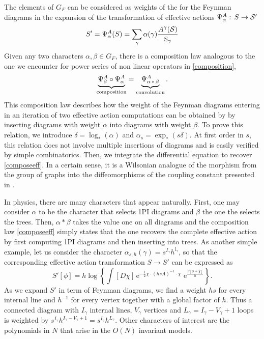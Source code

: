 \documentclass[12pt,here,feynmf]{article}
\begin{document}
The elements of $G_{F}$ can be considered as weights of the for the Feynman diagrams in the expansion of the transformation of effective actions $\Psi^{A}_{\alpha}:\,S\rightarrow{\cal
S}'$
\begin{equation}
S'=\Psi^{A}_{\alpha}(S)=\sum_{\gamma}\alpha(\gamma)\frac{A^{\gamma}({\cal
S})}{{\mbox{{\small S}}_{\gamma}}}
\end{equation}
Given any two characters $\alpha,\beta\in G_{F}$, there is a composition law analogous to the one we encounter for power series of non linear operators in \eqref{composition},
\begin{equation}
\underbrace{\Psi^{A}_{\beta}\circ\Psi^{A}_{\alpha}}_{\mbox{\scriptsize
composition}}=
\underbrace{\Psi^{A}_{\alpha\,\ast\,\beta}}_{\mbox{\scriptsize
convolution}}.
\label{composeeff}
\end{equation}
This composition law describes how the weight of the Feynman diagrams entering in an iteration of two  effective action computations can be obtained by by inserting diagrams with weight $\alpha$ into diagrams with weight $\beta$. To prove this relation, we introduce $\delta=\log_{\ast}(\alpha)$ and $\alpha_{s}=\exp_{\ast}(s\delta)$. At first order in $s$, this relation does not involve multiple insertions of diagrams and is easily verified by simple combinatorics. Then, we integrate the differential equation to recover \eqref{composeeff}. In a certain sense, it is a Wilsonian analogue of the morphism from the group of graphs into the diffeomorphisms of the coupling constant presented in \cite{ck2}. 

In physics, there are many characters  that appear naturally. First, one may consider $\alpha$ to be the character that selects 1PI diagrams and $\beta$ the one the selects the trees. Then, $\alpha\ast\beta$ takes the value one on all diagrams and the composition law \eqref{composeeff} simply states that the one recovers the complete effective action by first computing 1PI diagrams and then inserting into trees. As another simple example, let us consider the character $\alpha_{s,h}(\gamma)=s^{I_{\gamma}}h^{l_{\gamma}}$, so that the corresponding effective action transformation $S\rightarrow S'$ can be expressed as
\begin{equation}
S'[\phi]=h\log\left\{
\int[D\chi]\,\mathrm{e}^{-\frac{1}{2}\chi\cdot (hsA)^{-1}\cdot \chi}\,
\,\mathrm{e}^{\frac{S[\phi+\chi]}{h}}
\right\}.
\label{loopeff}
\end{equation} 
As we expand $S'$ in term of Feynman diagrams, we find a weight $hs$ for every internal line and $h^{-1}$ for every vertex together with a global factor of $h$. Thus a connected diagram with $I_{\gamma}$ internal lines, $V_{\gamma}$ vertices and $L_{\gamma}=I_{\gamma}-V_{\gamma}+1$ loops is weighted by $s^{I_{\gamma}}h^{I_{\gamma}-V_{\gamma}+1}=s^{I_{\gamma}}h^{L_{\gamma}}.$ 
Other characters of interest are the polynomials in $N$ that arise in the $O(N)$ invariant models.
\end{document}
